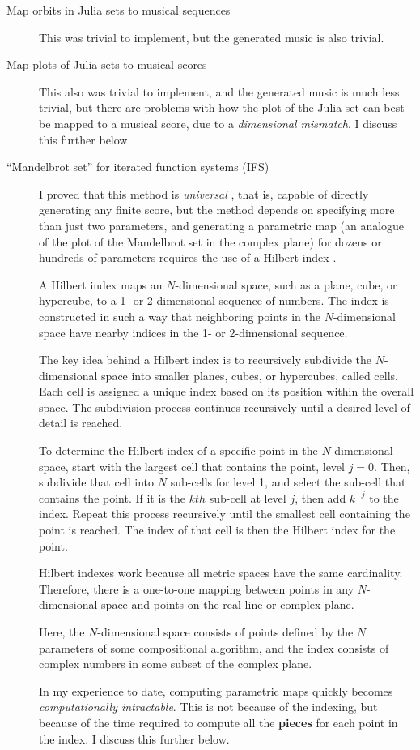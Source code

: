 \documentclass[11pt]{scrartcl}
\begin{document}
\begin{description}
\item[Map orbits in Julia sets to musical sequences] This was trivial to implement, but the generated music is also trivial.
\item[Map plots of Julia sets to musical scores] This also was trivial to implement, and the generated music is much less trivial, but there are problems with how the plot of the Julia set can best be mapped to a musical score, due to a \emph{dimensional mismatch}. I discuss this further below.
\item[``Mandelbrot set'' for iterated function systems (IFS)] I proved that this method is \emph{universal} \parencite{obsessed, gogins2023scoregraphs}, that is, capable of directly generating any finite score, but the method depends on specifying more than just two parameters, and generating a parametric map (an analogue of the plot of the Mandelbrot set in the complex plane) for dozens or hundreds of parameters requires the use of a Hilbert index \parencite{patrick1968mapping}. 

A Hilbert index maps an $N$-dimensional space, such as a plane, cube, or hypercube, to a 1- or 2-dimensional sequence of numbers. The index is constructed in such a way that neighboring points in the $N$-dimensional space have nearby indices in the 1- or 2-dimensional sequence.

The key idea behind a Hilbert index is to recursively subdivide the $N$-dimensional space into smaller planes, cubes, or hypercubes, called cells. Each cell is assigned a unique index based on its position within the overall space. The subdivision process continues recursively until a desired level of detail is reached.

To determine the Hilbert index of a specific point in the $N$-dimensional space, start with the largest cell that contains the point, level $j = 0$. Then, subdivide that cell into $N$ sub-cells for level 1, and select the sub-cell that contains the point. If it is the $kth$ sub-cell at level $j$, then add $k^{-j}$ to the index. Repeat this process recursively until the smallest cell containing the point is reached. The index of that cell is then the Hilbert index for the point.
  
Hilbert indexes work because all metric spaces have the same cardinality. Therefore, there is a one-to-one mapping between points in any $N$-dimensional space and points on the real line or complex plane.

Here, the $N$-dimensional space consists of points defined by the $N$ parameters of some compositional algorithm, and the index consists of complex numbers in some subset of the complex plane.

In my experience to date, computing parametric maps quickly becomes \emph{computationally intractable}. This is not because of the indexing, but because of the time required to compute all the \textbf{pieces} for each point in the index. I discuss this further below.
\end{description}
\end{document}
